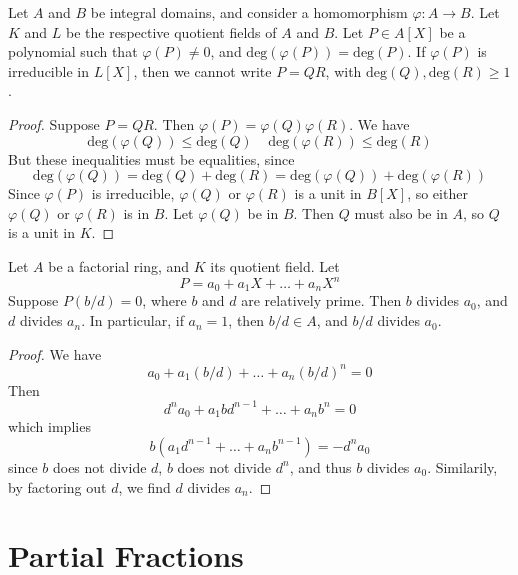 \begin{theorem}
    Let $A$ and $B$ be integral domains, and consider a homomorphism $\varphi:A \to B$. Let $K$ and $L$ be the respective quotient fields of $A$ and $B$. Let $P \in A[X]$ be a polynomial such that $\varphi(P) \neq 0$, and $\text{deg}(\varphi(P)) = \text{deg}(P)$. If $\varphi(P)$ is irreducible in $L[X]$, then we cannot write $P = QR$, with $\text{deg}(Q), \text{deg}(R) \geq 1$.
\end{theorem}
\begin{proof}
    Suppose $P = QR$. Then $\varphi(P) = \varphi(Q) \varphi(R)$. We have
    \[ \text{deg}(\varphi(Q)) \leq \text{deg}(Q)\ \ \ \ \ \text{deg}(\varphi(R)) \leq \text{deg}(R) \]
    But these inequalities must be equalities, since
    \[ \text{deg}(\varphi(Q)) = \text{deg}(Q) + \text{deg}(R) = \text{deg}(\varphi(Q)) + \text{deg}(\varphi(R)) \]
    Since $\varphi(P)$ is irreducible, $\varphi(Q)$ or $\varphi(R)$ is a unit in $B[X]$, so either $\varphi(Q)$ or $\varphi(R)$ is in $B$. Let $\varphi(Q)$ be in $B$. Then $Q$ must also be in $A$, so $Q$ is a unit in $K$.
\end{proof}

\begin{theorem}
    Let $A$ be a factorial ring, and $K$ its quotient field. Let
    \[ P = a_0 + a_1 X + \dots + a_n X^n \]
    Suppose $P(b/d) = 0$, where $b$ and $d$ are relatively prime. Then $b$ divides $a_0$, and $d$ divides $a_n$. In particular, if $a_n = 1$, then $b/d \in A$, and $b/d$ divides $a_0$.
\end{theorem}
\begin{proof}
    We have
    \[ a_0 + a_1 (b/d) + \dots + a_n (b/d)^n = 0 \]
    Then
    \[ d^n a_0 + a_1 b d^{n-1} + \dots + a_n b^n = 0 \]
    which implies
    \[ b(a_1 d^{n-1} + \dots + a_n b^{n-1}) = -d^n a_0 \]
    since $b$ does not divide $d$, $b$ does not divide $d^n$, and thus $b$ divides $a_0$. Similarily, by factoring out $d$, we find $d$ divides $a_n$.
\end{proof}



\section{Partial Fractions}

